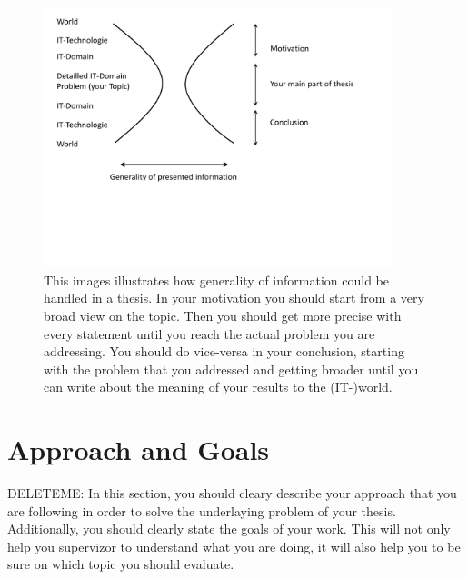 \begin{figure}
\centering
\includegraphics[width=0.9\textwidth]{template/writing}
\caption[Information Generality]{This images illustrates how generality of information could be handled in a thesis. In your motivation you should start from a very broad view on the topic. Then you should get more precise with every statement until you reach the actual problem you are addressing. You should do vice-versa in your conclusion, starting with the problem that you addressed and getting broader until you can write about the meaning of your results to the (IT-)world.\label{fig:writing}}
\end{figure}


\section{Approach and Goals}
DELETEME: In this section, you should cleary describe your approach that you are following in order to solve the underlaying problem of your thesis. Additionally, you should clearly state the goals of your work. This will not only help you supervizor to understand what you are doing, it will also help you to be sure on which topic you should evaluate.

